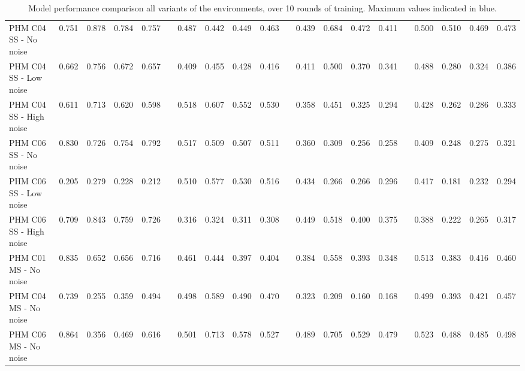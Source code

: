 \documentclass[a4paper, 12pt]{article}
\begin{document}
\begin{appendices}
\begin{landscape}
\begin{table}
\begin{tabular}{@{}l rrrr c rrrr c rrrr c rrrr@{}}
			PHM C04 SS - No noise &\textcolor{dblue}{0.751} &\textcolor{dblue}{0.878} &\textcolor{dblue}{0.784} & \textcolor{dblue}{0.757} & & 0.487 &0.442 &0.449 &0.463 & &0.439 &0.684 &0.472 &0.411 & &0.500 &0.510 &0.469&0.473\\
			PHM C04 SS - Low noise &\textcolor{dblue}{0.662} &\textcolor{dblue}{0.756} &\textcolor{dblue}{0.672} & \textcolor{dblue}{0.657} & & 0.409 &0.455 &0.428 &0.416 & &0.411 &0.500 &0.370 &0.341 & &0.488 &0.280 &0.324&0.386\\
			PHM C04 SS - High noise &\textcolor{dblue}{0.611} &\textcolor{dblue}{0.713} &\textcolor{dblue}{0.620} & \textcolor{dblue}{0.598} & & 0.518 &0.607 &0.552 &0.530 & &0.358 &0.451 &0.325 &0.294 & &0.428 &0.262 &0.286&0.333\\ \hdashline
			
			PHM C06 SS - No noise &\textcolor{dblue}{0.830} &\textcolor{dblue}{0.726} &\textcolor{dblue}{0.754} & \textcolor{dblue}{0.792} & & 0.517 &0.509 &0.507 &0.511 & &0.360 &0.309 &0.256 &0.258 & &0.409 &0.248 &0.275&0.321\\
			PHM C06 SS - Low noise &0.205 &0.279 &0.228 & 0.212 & & \textcolor{dblue}{0.510} &\textcolor{dblue}{0.577} &\textcolor{dblue}{0.530} &\textcolor{dblue}{0.516} & &0.434 &0.266 &0.266 &0.296 & &0.417 &0.181 &0.232&0.294\\
			PHM C06 SS - High noise &\textcolor{dblue}{0.709} &\textcolor{dblue}{0.843} &\textcolor{dblue}{0.759 }& \textcolor{dblue}{0.726} & & 0.316 &0.324 &0.311 &0.308 & &0.449 &0.518 &0.400 &0.375 & &0.388 &0.222 &0.265&0.317\\ \midrule
			
			PHM C01 MS - No noise &\textcolor{dblue}{0.835} &\textcolor{dblue}{0.652} &\textcolor{dblue}{0.656} & \textcolor{dblue}{0.716} & & 0.461 &0.444 &0.397 &0.404 & &0.384 &0.558 &0.393 &0.348 & &0.513 &0.383 &0.416&0.460\\
			PHM C04 MS - No noise &\textcolor{dblue}{0.739} &0.255 &0.359 & \textcolor{dblue}{0.494} & & 0.498 &\textcolor{dblue}{0.589 }&\textcolor{dblue}{0.490} &0.470 & &0.323 &0.209 &0.160 &0.168 & &0.499 &0.393 &0.421&0.457\\
			PHM C06 MS - No noise &\textcolor{dblue}{0.864} &0.356 &0.469 & \textcolor{dblue}{0.616} & & 0.501 &\textcolor{dblue}{0.713} &\textcolor{dblue}{0.578} &0.527 & &0.489 &0.705 &0.529 &0.479 & &0.523 &0.488 &0.485&0.498\\
			
			\bottomrule
		\end{tabular}
		\caption{Model performance comparison all variants of the environments, over 10 rounds of training. Maximum values indicated in   \textcolor{dblue}{blue}.}
		\label{tbl:DetailedMetrics}
	\end{table}
\end{landscape}
\restoregeometry %


\end{appendices}
\end{document}

